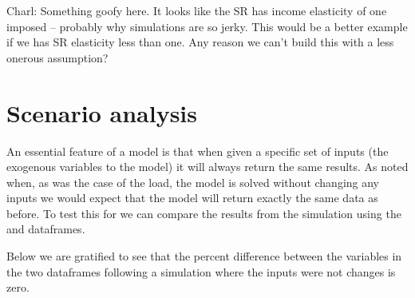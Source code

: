 \documentclass[letterpaper,10pt,english]{jupyterBook}
\begin{document}
\sphinxAtStartPar
 Charl: Something goofy here. It looks like the SR has income elasticity of one imposed – probably why simulations are so jerky. This would be a better example if we has SR elasticity less than one.  Any reason we can’t build this with a less onerous assumption?


\chapter{Scenario analysis}
\label{\detokenize{content/06_WBModels/LoadingWBModel:scenario-analysis}}
\sphinxAtStartPar
An essential feature of a model is that when given a specific set of inputs (the exogenous variables to the model) it will always return the same results. As noted when, as was the case of the load, the model is solved without changing any inputs we would expect that the model will return exactly the same data as before.  To test this for  we can compare the results from the simulation using the  and  dataframes.

\sphinxAtStartPar
Below we are gratified to see that the percent difference between the variables in the two dataframes following a simulation where the inputs were not changes is zero.
\end{document}
